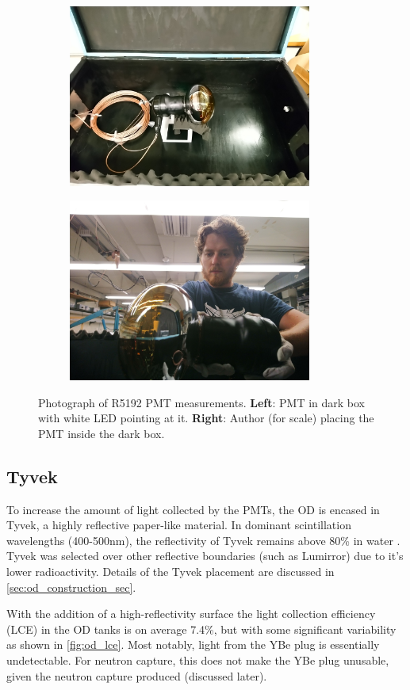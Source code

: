 \begin{figure}[!htbp]
\begin{subfigure}{.5\textwidth}
  \centering
  \includegraphics[height=6cm, width=\linewidth]{Figures/OD_PMTs/od_pmt_in_dark_box.JPG}
  \end{subfigure}
  \begin{subfigure}{.5\textwidth}
  \centering
  \includegraphics[height=6cm, width=\linewidth]{Figures/OD_PMTs/sam_holding_od_pmt.JPG}
  \end{subfigure}
\caption{Photograph of R5192 PMT measurements. \textbf{Left}: PMT in dark box with white LED pointing at it. \textbf{Right}: Author (for scale) placing the PMT inside the dark box.}
\label{fig:od_pmt_brandeis_measurements}
\end{figure}


\subsection{Tyvek}
\par
To increase the amount of light collected by the PMTs, the OD is encased in Tyvek, a highly reflective paper-like material.
In dominant scintillation wavelengths (400-500nm), the reflectivity of Tyvek remains above 80\% in water \cite{tyvek_thesis_ref,tyvek_reflectivity_ref}. 
Tyvek was selected over other reflective boundaries (such as Lumirror{\texttrademark}) due to it's lower radioactivity.
Details of the Tyvek placement are discussed in \autoref{sec:od_construction_sec}.
\par
With the addition of a high-reflectivity surface the light collection efficiency (LCE) in the OD tanks is on average 7.4\%, but with some significant variability as shown in \autoref{fig:od_lce}.
Most notably, light from the YBe plug is essentially undetectable.
For neutron capture, this does not make the YBe plug unusable, given the neutron capture produced (discussed later).

